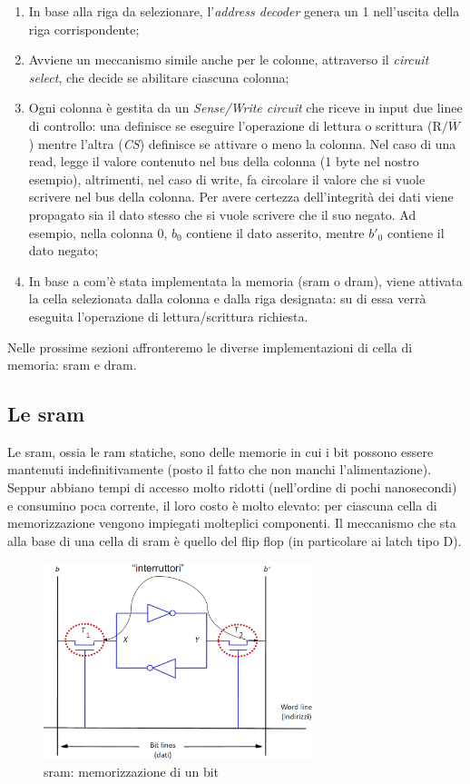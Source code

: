 \documentclass[class=book, crop=false, oneside]{standalone}
\begin{document}
\begin{enumerate}
	\item In base alla riga da selezionare, l'\emph{address decoder} genera un 1 nell'uscita della riga corrispondente;
	\item Avviene un meccanismo simile anche per le colonne, attraverso il \emph{circuit select}, che decide se abilitare ciascuna colonna;
	\item Ogni colonna è gestita da un \emph{Sense/Write circuit} che riceve in input due linee di controllo: una definisce se eseguire l'operazione di lettura o scrittura (\emph{\(\textrm{R/}\overline{W}\)}) mentre l'altra (\emph{CS}) definisce se attivare o meno la colonna. Nel caso di una read, legge il valore contenuto nel bus della colonna (1 byte nel nostro esempio), altrimenti, nel caso di write, fa circolare il valore che si vuole scrivere nel bus della colonna. Per avere certezza dell'integrità dei dati viene propagato sia il dato stesso che si vuole scrivere che il suo negato. Ad esempio, nella colonna 0, \(b_0\) contiene il dato asserito, mentre \(b'_0\) contiene il dato negato;
	\item In base a com'è stata implementata la memoria (\acrshort{sram} o \acrshort{dram}), viene attivata la cella selezionata dalla colonna e dalla riga designata: su di essa verrà eseguita l'operazione di lettura/scrittura richiesta.
\end{enumerate}

Nelle prossime sezioni affronteremo le diverse implementazioni di cella di memoria: \acrshort{sram} e \acrshort{dram}.

\subsection{Le \acrfull{sram}}
Le \acrshort{sram}, ossia le \acrshort{ram} statiche, sono delle memorie in cui i bit possono essere mantenuti indefinitivamente (posto il fatto che non manchi l'alimentazione). Seppur abbiano tempi di accesso molto ridotti (nell'ordine di pochi nanosecondi) e consumino poca corrente, il loro costo è molto elevato: per ciascuna cella di memorizzazione vengono impiegati molteplici componenti.
Il meccanismo che sta alla base di una cella di \acrshort{sram} è quello del flip flop (in particolare ai latch tipo D).

\begin{figure}[H]
	\centering
	\includegraphics[width=0.7\textwidth,keepaspectratio]{cella_SRAM.png}
	\caption{\acrshort{sram}: memorizzazione di un bit}
\end{figure}
\end{document}
